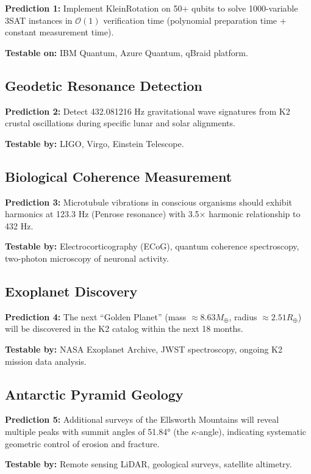 \documentclass[11pt,a4paper]{article}
\begin{document}
\textbf{Prediction 1:} Implement KleinRotation on 50+ qubits to solve 1000-variable 3SAT instances in $\mathcal{O}(1)$ verification time (polynomial preparation time + constant measurement time).

\textbf{Testable on:} IBM Quantum, Azure Quantum, qBraid platform.

\subsection{Geodetic Resonance Detection}

\textbf{Prediction 2:} Detect 432.081216 Hz gravitational wave signatures from K2 crustal oscillations during specific lunar and solar alignments.

\textbf{Testable by:} LIGO, Virgo, Einstein Telescope.

\subsection{Biological Coherence Measurement}

\textbf{Prediction 3:} Microtubule vibrations in conscious organisms should exhibit harmonics at 123.3 Hz (Penrose resonance) with 3.5× harmonic relationship to 432 Hz.

\textbf{Testable by:} Electrocorticography (ECoG), quantum coherence spectroscopy, two-photon microscopy of neuronal activity.

\subsection{Exoplanet Discovery}

\textbf{Prediction 4:} The next ``Golden Planet'' (mass $\approx 8.63 M_\oplus$, radius $\approx 2.51 R_\oplus$) will be discovered in the K2 catalog within the next 18 months.

\textbf{Testable by:} NASA Exoplanet Archive, JWST spectroscopy, ongoing K2 mission data analysis.

\subsection{Antarctic Pyramid Geology}

\textbf{Prediction 5:} Additional surveys of the Ellsworth Mountains will reveal multiple peaks with summit angles of 51.84° (the $\kappa$-angle), indicating systematic geometric control of erosion and fracture.

\textbf{Testable by:} Remote sensing LiDAR, geological surveys, satellite altimetry.
\end{document}
